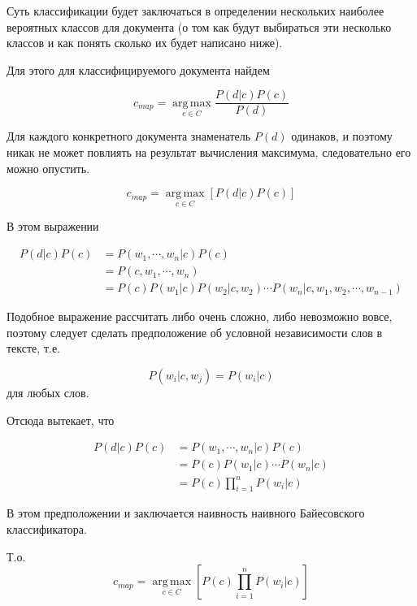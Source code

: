 \documentclass[12pt,a4paper]{scrartcl}
\begin{document}
Суть классификации будет заключаться в определении нескольких наиболее вероятных классов для документа (о том как будут выбираться эти несколько классов и как понять сколько их будет написано ниже).

Для этого для классифицируемого документа найдем

\begin{equation*}
    c_{map}=\operatorname*{arg\,max}_{c \in C} \frac{ P(d|c)P(c) }{ P(d) }
\end{equation*}

Для каждого конкретного документа знаменатель $P(d)$ одинаков, и поэтому никак не может повлиять на результат вычисления максимума, следовательно его можно опустить.

\begin{equation*}
    c_{map}=\operatorname*{arg\,max}_{c \in C} [P(d|c)P(c)]
\end{equation*}

В этом выражении 

\begin{align*}
    P(d|c)P(c) &= P(w_1, \cdots, w_n|c)P(c) \\ &= P(c,w_1, \cdots, w_n) \\ & =
    P(c)P(w_1|c)P(w_2|c, w_2) \cdots P(w_n|c, w_1, w_2, \cdots, w_{n-1})
\end{align*}

Подобное выражение рассчитать либо очень сложно, либо невозможно вовсе, поэтому следует сделать предположение об условной независимости слов в тексте, т.е. 

\begin{equation*}
    P(w_i|c, w_j) = P(w_i|c) 
\end{equation*}
для любых слов.

Отсюда вытекает, что 

\begin{align*}
    P(d|c)P(c) &= P(w_1, \cdots, w_n|c)P(c) \\ &= P(c)P(w_1|c) \cdots P(w_n|c) \\ &= 
    P(c)\prod\limits_{i=1}^n P(w_i|c)
\end{align*}

В этом предположении и заключается наивность наивного Байесовского классификатора.

Т.о. 
\begin{equation*}
    c_{map}=\operatorname*{arg\,max}_{c \in C} [P(c)\prod\limits_{i=1}^n P(w_i|c)]
\end{equation*}
\end{document}
